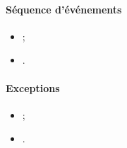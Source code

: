 \paragraph{Séquence d'événements}
\begin{itemize}
	\item ;
	\item .
\end{itemize}

\paragraph{Exceptions}
\begin{itemize}
	\item ;
	\item .
\end{itemize}

